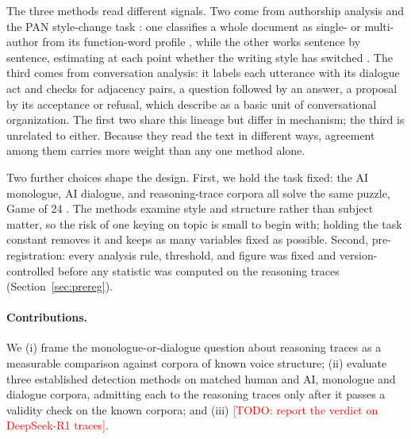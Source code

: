 \documentclass[11pt]{article}
\newcommand{\todo}[1]{\textcolor{red}{[TODO: #1]}}
\begin{document}
The three methods read different signals. Two come from authorship analysis
and the PAN style-change task \citep{zangerle2025pan}: one classifies a whole
document as single- or multi-author from its function-word profile
\citep{nath2019style}, while the other works sentence by sentence, estimating
at each point whether the writing style has switched \citep{schmidt2025sspc}.
The third comes from conversation analysis: it labels each utterance with its
dialogue act and checks for adjacency pairs, a question followed by an
answer, a proposal by its acceptance or refusal, which
\citet{schegloff1973opening} describe as a basic unit of conversational
organization. The first two share this lineage but differ in mechanism; the
third is unrelated to either. Because they read the text in different ways,
agreement among them carries more weight than any one method alone.

Two further choices shape the design. First, we hold the task fixed: the AI
monologue, AI dialogue, and reasoning-trace corpora all solve the same
puzzle, Game of 24 \citep{yao2023tree}. The methods examine style and
structure rather than subject matter, so the risk of one keying on topic is
small to begin with; holding the task constant removes it and keeps as many
variables fixed as possible. Second, pre-registration: every analysis rule,
threshold, and figure was fixed and version-controlled before any statistic
was computed on the reasoning traces (Section~\ref{sec:prereg}).

\paragraph{Contributions.}
We (i) frame the monologue-or-dialogue question about reasoning traces as a
measurable comparison against corpora of known voice structure; (ii) evaluate
three established detection methods on matched human and AI, monologue and
dialogue corpora, admitting each to the reasoning traces only after it passes
a validity check on the known corpora; and (iii) \todo{report the verdict on
DeepSeek-R1 traces}.
\end{document}
